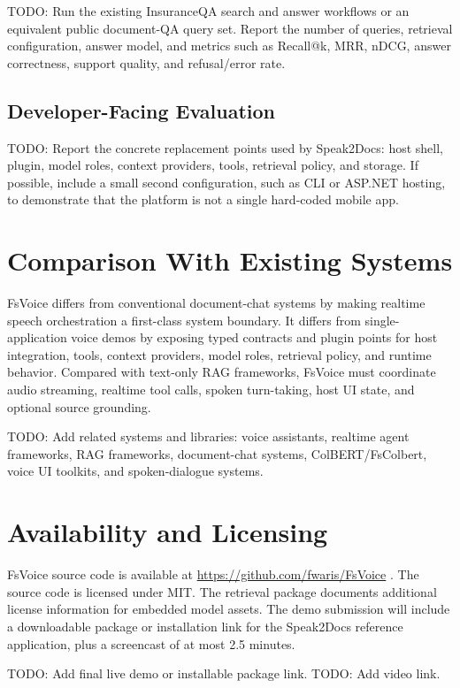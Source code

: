 \documentclass[11pt]{article}
\begin{document}
TODO: Run the existing InsuranceQA search and answer workflows or an equivalent public document-QA query set. Report the number of queries, retrieval configuration, answer model, and metrics such as Recall@k, MRR, nDCG, answer correctness, support quality, and refusal/error rate.

\subsection{Developer-Facing Evaluation}

TODO: Report the concrete replacement points used by Speak2Docs: host shell, plugin, model roles, context providers, tools, retrieval policy, and storage. If possible, include a small second configuration, such as CLI or ASP.NET hosting, to demonstrate that the platform is not a single hard-coded mobile app.

\section{Comparison With Existing Systems}

FsVoice differs from conventional document-chat systems by making realtime speech orchestration a first-class system boundary. It differs from single-application voice demos by exposing typed contracts and plugin points for host integration, tools, context providers, model roles, retrieval policy, and runtime behavior. Compared with text-only RAG frameworks, FsVoice must coordinate audio streaming, realtime tool calls, spoken turn-taking, host UI state, and optional source grounding.

TODO: Add related systems and libraries: voice assistants, realtime agent frameworks, RAG frameworks, document-chat systems, ColBERT/FsColbert, voice UI toolkits, and spoken-dialogue systems.

\section{Availability and Licensing}

FsVoice source code is available at \url{https://github.com/fwaris/FsVoice} \citep{fsvoice}. The source code is licensed under MIT. The retrieval package documents additional license information for embedded model assets. The demo submission will include a downloadable package or installation link for the Speak2Docs reference application, plus a screencast of at most 2.5 minutes.

TODO: Add final live demo or installable package link.
TODO: Add video link.
\end{document}

